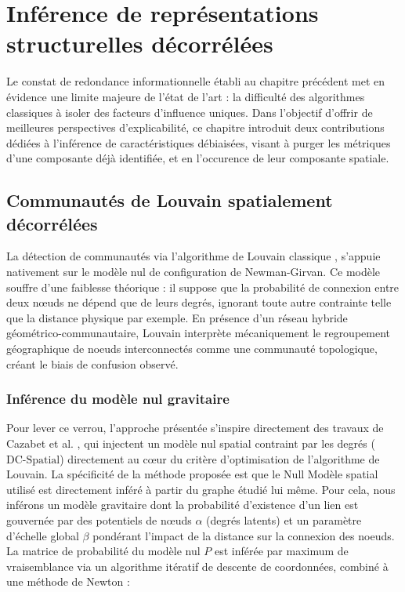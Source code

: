 \section{Inférence de représentations structurelles décorrélées}
\label{sec:debiaisage_structurel}

Le constat de redondance informationnelle établi au chapitre précédent met en évidence une limite majeure de l'état de l'art : la difficulté des algorithmes classiques à isoler des facteurs d'influence uniques. Dans l'objectif d'offrir de meilleures perspectives d'explicabilité, ce chapitre introduit deux contributions dédiées à l'inférence de caractéristiques débiaisées, visant à purger les métriques d'une composante déjà identifiée, et en l'occurence de leur composante spatiale.

\subsection{Communautés de Louvain spatialement décorrélées}

La détection de communautés via l'algorithme de Louvain classique \cite{louvain2008}, s'appuie nativement sur le modèle nul de configuration de Newman-Girvan. Ce modèle souffre d'une faiblesse théorique : il suppose que la probabilité de connexion entre deux nœuds ne dépend que de leurs degrés, ignorant toute autre contrainte telle que la distance physique par exemple. En présence d'un réseau hybride géométrico-communautaire, Louvain interprète mécaniquement le regroupement géographique de noeuds interconnectés comme une communauté topologique, créant le biais de confusion observé.

\subsubsection{Inférence du modèle nul gravitaire}
Pour lever ce verrou, l'approche présentée s'inspire directement des travaux de Cazabet et al. \cite{cazabet2022enhancing}, qui injectent un modèle nul spatial contraint par les degrés ($\text{DC-Spatial}$) directement au cœur du critère d'optimisation de l'algorithme de Louvain. La spécificité de la méthode proposée est que le Null Modèle spatial utilisé est directement inféré à partir du graphe étudié lui même.
Pour cela, nous inférons un modèle gravitaire dont la probabilité d'existence d'un lien est gouvernée par des potentiels de nœuds $\alpha$ (degrés latents) et un paramètre d'échelle global $\beta$ pondérant l'impact de la distance sur la connexion des noeuds. La matrice de probabilité du modèle nul $P$ est inférée par maximum de vraisemblance via un algorithme itératif de descente de coordonnées, combiné à une méthode de Newton :

